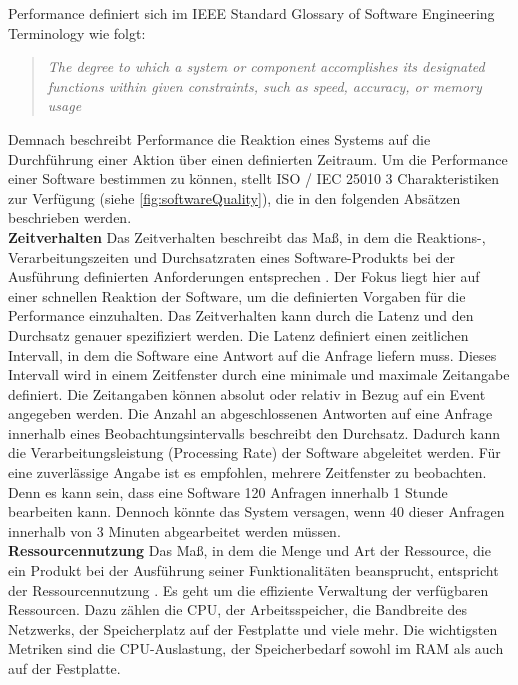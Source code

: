 \noindent
Performance definiert sich im IEEE Standard Glossary of Software Engineering Terminology wie folgt:
\begin{quote}
	\emph{\grqq{}The degree to which a system or component accomplishes its designated functions within given constraints, such as speed, accuracy, or memory usage\grqq{}} \cite{IEEE.}
\end{quote}

\noindent
Demnach beschreibt Performance die Reaktion eines Systems auf die Durchführung einer Aktion über einen definierten Zeitraum. Um die Performance einer Software bestimmen zu können, stellt ISO / IEC 25010 3 Charakteristiken zur Verfügung (siehe \autoref{fig:softwareQuality}), die in den folgenden Absätzen beschrieben werden.\\

\noindent
\textbf{Zeitverhalten}\newline
Das Zeitverhalten beschreibt das Maß, in dem die Reaktions-, Verarbeitungszeiten und Durchsatzraten eines Software-Produkts bei der Ausführung definierten Anforderungen entsprechen \cite{ISOIEC.}. Der Fokus liegt hier auf einer schnellen Reaktion der Software, um die definierten Vorgaben für die Performance einzuhalten. Das Zeitverhalten kann durch die Latenz und den Durchsatz genauer spezifiziert werden. Die Latenz definiert einen zeitlichen Intervall, in dem die Software eine Antwort auf die Anfrage liefern muss. Dieses Intervall wird in einem Zeitfenster durch eine minimale und maximale Zeitangabe definiert. Die Zeitangaben können absolut oder relativ in Bezug auf ein Event angegeben werden. Die Anzahl an abgeschlossenen Antworten auf eine Anfrage innerhalb eines Beobachtungsintervalls beschreibt den Durchsatz. Dadurch kann die Verarbeitungsleistung (Processing Rate) der Software abgeleitet werden. Für eine zuverlässige Angabe ist es empfohlen, mehrere Zeitfenster zu beobachten. Denn es kann sein, dass eine Software 120 Anfragen innerhalb 1 Stunde bearbeiten kann. Dennoch könnte das System versagen, wenn 40 dieser Anfragen innerhalb von 3 Minuten abgearbeitet werden müssen.\cite{Barbacci.1995}\\

\noindent
\textbf{Ressourcennutzung}\newline
Das Maß, in dem die Menge und Art der Ressource, die ein Produkt bei der Ausführung seiner Funktionalitäten beansprucht, entspricht der Ressourcennutzung \cite{ISOIEC.}. Es geht um die effiziente Verwaltung der verfügbaren Ressourcen. Dazu zählen die CPU, der Arbeitsspeicher, die Bandbreite des Netzwerks, der Speicherplatz auf der Festplatte und viele mehr. Die wichtigsten Metriken sind die CPU-Auslastung, der Speicherbedarf sowohl im RAM als auch auf der Festplatte.\cite{Barbacci.1995}\\

